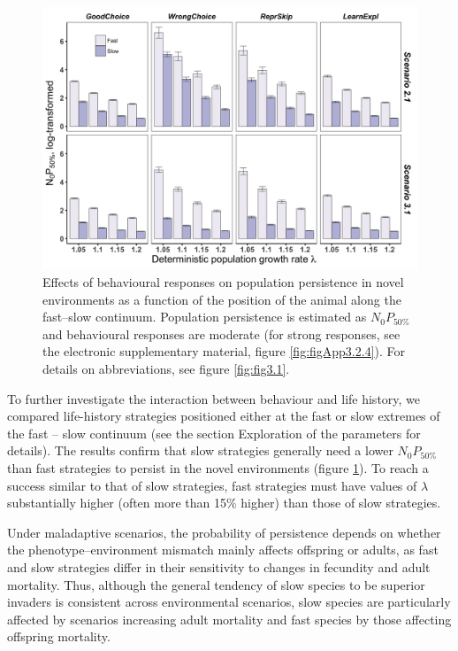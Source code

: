\begin{figure}
\centering
\includegraphics[width=\textwidth]{./Figures/chapter03/Fig_3.jpg}
\caption[Effects on $N_{0}P_{50\%}$]{
Effects of behavioural responses on population persistence in novel environments
as a function of the position of the animal along the fast–slow continuum.
Population persistence is estimated as $N_{0}P_{50\%}$ and behavioural responses
are moderate (for strong responses, see the electronic supplementary material,
figure \ref{fig:figApp3.2.4}). For details on abbreviations, see figure
\ref{fig:fig3.1}.}
\label{fig:fig3.3}
\end{figure}

To further investigate the interaction between behaviour and
life history, we compared life-history strategies positioned
either at the fast or slow extremes of the fast – slow continuum
(see the section Exploration of the parameters for details). The
results confirm that slow strategies generally need a lower
$N_{0}P_{50\%}$ than fast strategies to persist in the novel environments
(figure \ref{fig:fig3.3}). To reach a success similar to that of slow strategies,
fast strategies must have values of $\lambda$ substantially higher (often
more than 15\% higher) than those of slow strategies.

Under maladaptive scenarios, the probability of persistence
depends on whether the phenotype–environment mismatch
mainly affects offspring or adults, as fast and slow strategies
differ in their sensitivity to changes in fecundity and adult mortality.
Thus, although the general tendency of slow species to
be superior invaders is consistent across environmental scenarios,
slow species are particularly affected by scenarios
increasing adult mortality and fast species by those affecting
offspring mortality.

